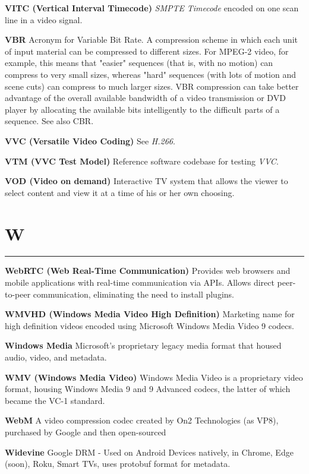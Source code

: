 \smallskip
\textbf{VITC (Vertical Interval Timecode)}
\textit{SMPTE} \textit{Timecode} encoded on one scan line in a video signal.

\smallskip
\textbf{VBR}
Acronym for Variable Bit Rate. A compression scheme in which each unit of input material can be compressed to different sizes. For MPEG-2 video, for example, this means that "easier" sequences (that is, with no motion) can compress to very small sizes, whereas "hard" sequences (with lots of motion and scene cuts) can compress to much larger sizes. VBR compression can take better advantage of the overall available bandwidth of a video transmission or DVD player by allocating the available bits intelligently to the difficult parts of a sequence. See also CBR.

\smallskip
\textbf{VVC (Versatile Video Coding)}
See \textit{H.266}.

\smallskip
\textbf{VTM (VVC Test Model)}
Reference software codebase for testing \textit{VVC}.

\smallskip
\textbf{VOD (Video on demand)}
Interactive TV system that allows the viewer to select content and view it at a time of his or her own choosing.


\section{W}
\hrule

\medskip
\textbf{WebRTC (Web Real-Time Communication)}
Provides web browsers and mobile applications with real-time communication via APIs. Allows direct peer-to-peer communication, eliminating the need to install plugins.

\smallskip
\textbf{WMVHD (Windows Media Video High Definition)}
Marketing name for high definition videos encoded using Microsoft Windows Media Video 9 codecs.

\smallskip
\textbf{Windows Media}
Microsoft's proprietary legacy media format that housed audio, video, and metadata.

\smallskip
\textbf{WMV (Windows Media Video)}
Windows Media Video is a proprietary video format, housing Windows Media 9 and 9 Advanced codecs, the latter of which became the VC-1 standard.

\smallskip
\textbf{WebM}
A video compression codec created by On2 Technologies (as VP8), purchased by Google and then open-sourced

\smallskip
\textbf{Widevine}
Google DRM - Used on Android Devices natively, in Chrome, Edge (soon), Roku, Smart TVs, uses protobuf format for metadata.

